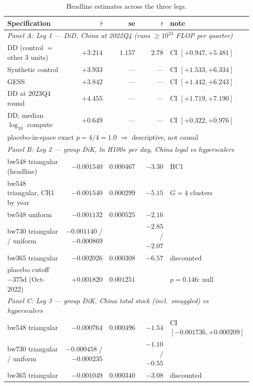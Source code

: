 \documentclass[11pt]{article}
\begin{document}
\begin{table}[t]
\centering
\footnotesize
\setlength{\tabcolsep}{4pt}
\caption{Headline estimates across the three legs.}
\label{tab:main}
\begin{tabular}{lrrrl}
\toprule
Specification & $\hat\tau$ & se & $t$ & note \\
\midrule
\multicolumn{5}{l}{\emph{Panel A: Leg 1 --- DiD, China at 2022Q4 (runs
$\geq 10^{24}$ FLOP per quarter)}}\\
DD (control $=$ other 3 units) & $+3.214$ & $1.157$ & $2.78$ & CI $[+0.947, +5.481]$ \\
Synthetic control              & $+3.933$ & --- & --- & CI $[+1.533, +6.334]$ \\
GESS                           & $+3.842$ & --- & --- & CI $[+1.442, +6.243]$ \\
DD at 2023Q4 round             & $+4.455$ & --- & --- & CI $[+1.719, +7.190]$ \\
DD, median $\log_{10}$ compute & $+0.649$ & --- & --- & CI $[+0.322, +0.976]$ \\
\multicolumn{5}{l}{\quad placebo-in-space exact $p = 4/4 = 1.0$ $\Rightarrow$
descriptive, not causal}\\
\midrule
\multicolumn{5}{l}{\emph{Panel B: Leg 2 --- group DiK, ln H100e per day,
China legal vs hyperscalers}}\\
bw548 triangular (headline)    & $-0.001540$ & $0.000467$ & $-3.30$ & HC1 \\
bw548 triangular, CR1 by year  & $-0.001540$ & $0.000299$ & $-5.15$ & $G=4$ clusters \\
bw548 uniform                  & $-0.001132$ & $0.000525$ & $-2.16$ & \\
bw730 triangular / uniform     & $-0.001140$ / $-0.000869$ & & $-2.85$ / $-2.07$ & \\
bw365 triangular               & $-0.002026$ & $0.000308$ & $-6.57$ & discounted \\
placebo cutoff $-375$d (Oct-2022) & $+0.001820$ & $0.001251$ & & $p=0.146$: null \\
\midrule
\multicolumn{5}{l}{\emph{Panel C: Leg 3 --- group DiK, China total stock
(incl.\ smuggled) vs hyperscalers}}\\
bw548 triangular               & $-0.000764$ & $0.000496$ & $-1.54$ & CI $[-0.001736, +0.000209]$ \\
bw730 triangular / uniform     & $-0.000458$ / $-0.000235$ & & $-1.10$ / $-0.55$ & \\
bw365 triangular               & $-0.001049$ & $0.000340$ & $-3.08$ & discounted \\
\bottomrule
\end{tabular}


\end{table}
\end{document}
